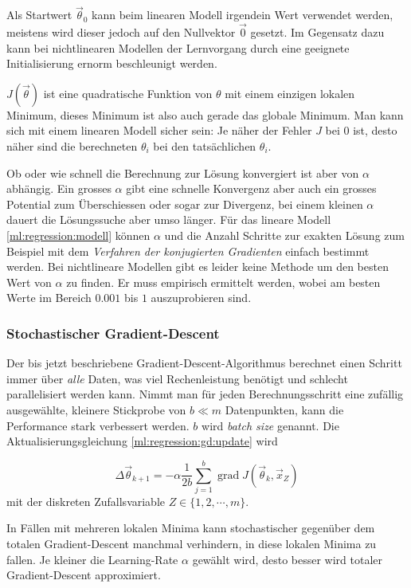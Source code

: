 Als Startwert $\vec\theta_0$ kann beim linearen Modell irgendein Wert verwendet werden, meistens wird dieser jedoch
auf den Nullvektor $\vec 0$ gesetzt. Im Gegensatz dazu kann bei nichtlinearen Modellen der Lernvorgang
durch eine geeignete Initialisierung ernorm beschleunigt werden.

$J(\vec \theta)$ ist eine quadratische Funktion von $\theta$ mit einem einzigen lokalen
Minimum, %
dieses Minimum ist also auch gerade das globale Minimum. Man kann sich mit einem linearen
Modell sicher sein: Je näher der Fehler $J$ bei $0$ ist, desto näher sind die berechneten
$\theta_i$ bei den tatsächlichen $\theta_i$.

Ob oder wie schnell die Berechnung zur Lösung konvergiert ist aber von $\alpha$ abhängig.
Ein grosses $\alpha$ gibt eine schnelle Konvergenz aber auch ein grosses Potential zum
Überschiessen oder sogar zur Divergenz, bei einem kleinen $\alpha$ dauert die Lösungssuche
aber umso länger.
Für das lineare Modell \eqref{ml:regression:modell} können $\alpha$ und die Anzahl Schritte
zur exakten Lösung zum Beispiel mit dem \emph{Verfahren der konjugierten Gradienten}
einfach bestimmt werden.
Bei nichtlineare Modellen gibt es leider keine Methode um den besten Wert von
$\alpha$ zu finden. Er muss empirisch ermittelt werden, wobei am besten Werte im Bereich
$0.001$ bis $1$ auszuprobieren sind. \cite[S. 51]{ml:introduction-to-ml}


\subsubsection{Stochastischer Gradient-Descent}

Der bis jetzt beschriebene Gradient-Descent-Algorithmus berechnet einen Schritt immer über
\emph{alle} Daten, was viel Rechenleistung benötigt und schlecht parallelisiert werden
kann.
Nimmt man für jeden Berechnungsschritt eine zufällig ausgewählte, kleinere Stickprobe von
$b \ll m$ Datenpunkten, kann die Performance stark verbessert werden. $b$ wird
\emph{batch size} genannt. Die Aktualisierungsgleichung \eqref{ml:regression:gd:update} wird

\begin{equation}
  \Delta \vec\theta_{k+1} = - \alpha \frac{1}{2b} \sum_{j=1}^{b} \operatorname{grad} J(\vec
  \theta_k, \vec x_Z)
\end{equation}
mit der diskreten Zufallsvariable $Z \in \{1, 2,\cdots, m\}$.

In Fällen mit mehreren lokalen Minima kann stochastischer gegenüber dem totalen Gradient-Descent manchmal
verhindern, in diese lokalen Minima zu fallen. Je kleiner die Learning-Rate $\alpha$ gewählt
wird, desto besser wird totaler Gradient-Descent approximiert. 
\cite[S. 93ff]{ml:ml-tom-mitchell}

